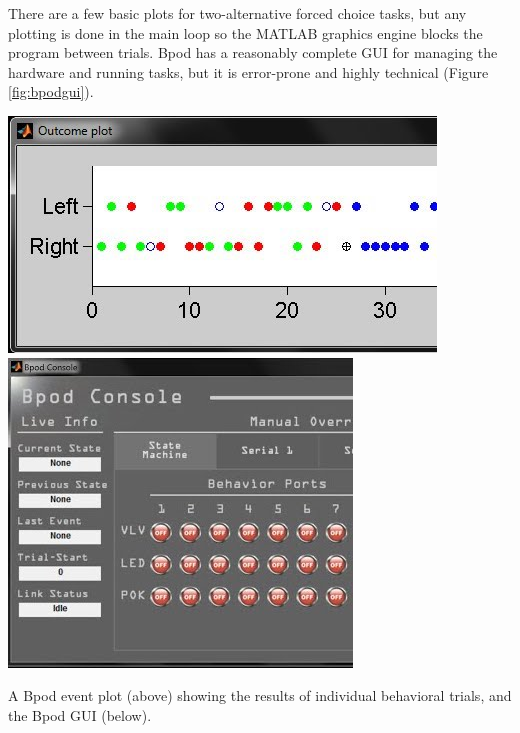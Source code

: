 There are a few basic plots for two-alternative forced choice tasks, but any plotting is done in the main loop so the MATLAB graphics engine blocks the program between trials. Bpod has a reasonably complete GUI for managing the hardware and running tasks, but it is error-prone and highly technical (Figure \ref{fig:bpodgui}).

\begin{marginfigure}
\noindent\includegraphics[]{figures/side_11_bplot.jpg}
\includegraphics[]{figures/Bconsole.jpg}
\caption{A Bpod event plot (above) showing the results of individual behavioral trials, and the Bpod GUI (below).} 
\label{fig:bpodgui}
\end{marginfigure}


\vspace{16pt}

